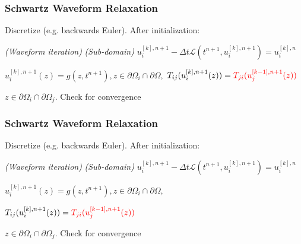 \documentclass{beamer}
\begin{document}
\begin{frame}
  \frametitle{Schwartz Waveform Relaxation}
  Discretize (e.g. backwards Euler). After initialization: 

  \begin{algorithmic}
    \textit{ (Waveform iteration)}
       \textit{ (Sub-domain)}
          \State $u_i^{[k],n+1} - \Delta t\mathcal{L}(t^{n+1},u_i^{[k],n+1}) = u_i^{[k],n}$

          \State $u_i^{[k],n+1}(z) = g(z,t^{n+1}), 
                z \in \partial\Omega_i\cap\partial\Omega,$
        \EndFor
          \State ${T}_{ij}(u_i^{[k],n+1}(z)) = 
                {\color{red}{T}_{ji}(u_j^{[k-1],n+1}(z))}$

          \State  $z \in \partial\Omega_i\cap\partial\Omega_j.$
        \EndFor
        \State Check for convergence
      \EndParFor
    \EndFor
  \end{algorithmic}
  
\end{frame}

\begin{frame}
  \frametitle{Schwartz Waveform Relaxation}
  Discretize (e.g. backwards Euler). After initialization: 

  \begin{algorithmic}
    \textit{ (Waveform iteration)}
       \textit{ (Sub-domain)}
          \State $u_i^{[k],n+1} - \Delta t\mathcal{L}(t^{n+1},u_i^{[k],n+1}) = u_i^{[k],n}$

          \State $u_i^{[k],n+1}(z) = g(z,t^{n+1}), 
                z \in \partial\Omega_i\cap\partial\Omega,$

          \State ${T}_{ij}(u_i^{[k],n+1}(z)) = 
                {\color{red}{T}_{ji}(u_j^{[k-1],n+1}(z))}$

          \State  $z \in \partial\Omega_i\cap\partial\Omega_j.$
        \EndFor
        \State Check for convergence
      \EndParFor
    \EndFor
  \end{algorithmic}
  
\end{frame}
\end{document}
